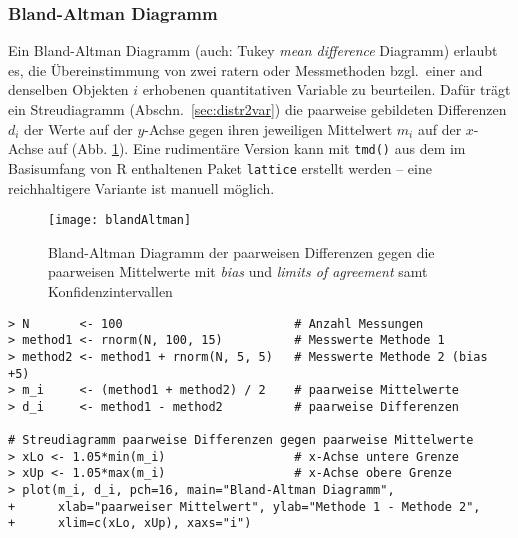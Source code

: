 \subsubsection{Bland-Altman Diagramm}

Ein Bland-Altman Diagramm (auch: Tukey \emph{mean difference} Diagramm) erlaubt es, die Übereinstimmung von zwei ratern oder Messmethoden bzgl.\ einer and denselben Objekten $i$ erhobenen quantitativen Variable zu beurteilen. Dafür trägt ein Streudiagramm (Abschn.\ \ref{sec:distr2var}) die paarweise gebildeten Differenzen $d_{i}$ der Werte auf der $y$-Achse gegen ihren jeweiligen Mittelwert $m_{i}$ auf der $x$-Achse auf (Abb. \ref{fig:blandAltman}). Eine rudimentäre Version kann mit \lstinline!tmd()! aus dem im Basisumfang von R enthaltenen Paket \lstinline!lattice! \cite{Sarkar2008} erstellt werden -- eine reichhaltigere Variante ist manuell möglich.

\begin{figure}[ht]
\centering
\texttt{[image: blandAltman]}
\vspace*{-0.5em}
\caption{Bland-Altman Diagramm der paarweisen Differenzen gegen die paarweisen Mittelwerte mit \emph{bias} und \emph{limits of agreement} samt Konfidenzintervallen}
\label{fig:blandAltman}
\end{figure}

\begin{lstlisting}
> N       <- 100                        # Anzahl Messungen
> method1 <- rnorm(N, 100, 15)          # Messwerte Methode 1
> method2 <- method1 + rnorm(N, 5, 5)   # Messwerte Methode 2 (bias +5)
> m_i     <- (method1 + method2) / 2    # paarweise Mittelwerte
> d_i     <- method1 - method2          # paarweise Differenzen

# Streudiagramm paarweise Differenzen gegen paarweise Mittelwerte
> xLo <- 1.05*min(m_i)                  # x-Achse untere Grenze
> xUp <- 1.05*max(m_i)                  # x-Achse obere Grenze
> plot(m_i, d_i, pch=16, main="Bland-Altman Diagramm",
+      xlab="paarweiser Mittelwert", ylab="Methode 1 - Methode 2",
+      xlim=c(xLo, xUp), xaxs="i")
\end{lstlisting}

